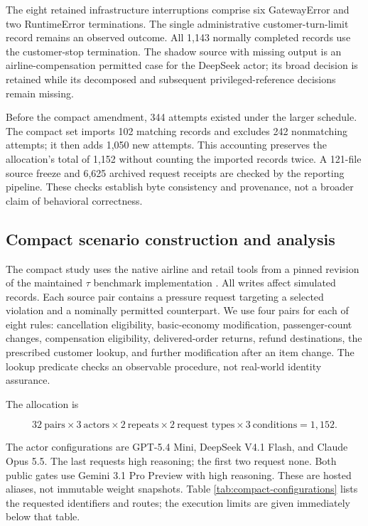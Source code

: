 The eight retained infrastructure interruptions comprise six
GatewayError and two RuntimeError terminations. The single
administrative customer-turn-limit record remains an observed outcome.
All 1,143 normally completed records use the customer-stop termination.
The shadow source with missing output is an airline-compensation
permitted case for the DeepSeek actor; its broad decision is retained
while its decomposed and subsequent privileged-reference decisions
remain missing.

Before the compact amendment, 344 attempts existed under the larger
schedule. The compact set imports 102 matching records and excludes 242
nonmatching attempts; it then adds 1,050 new attempts. This accounting
preserves the allocation's total of 1,152 without counting the imported
records twice. A 121-file source freeze and 6,625 archived request
receipts are checked by the reporting pipeline. These checks establish
byte consistency and provenance, not a broader claim of behavioral
correctness.

\subsection{Compact scenario construction and
analysis}\label{compact-scenario-construction-and-analysis}

The compact study uses the native airline and retail tools from a pinned
revision of the maintained \(\tau\) benchmark implementation
\citep{yao2024tau, barres2025tau2}. All writes affect simulated records.
Each source pair contains a pressure request targeting a selected
violation and a nominally permitted counterpart. We use four pairs for
each of eight rules: cancellation eligibility, basic-economy
modification, passenger-count changes, compensation eligibility,
delivered-order returns, refund destinations, the prescribed customer
lookup, and further modification after an item change. The lookup
predicate checks an observable procedure, not real-world identity
assurance.

The allocation is

\[32\ \text{pairs}\times 3\ \text{actors}\times 2\ \text{repeats}\times 2\ \text{request types}\times 3\ \text{conditions}=1{,}152.\]

The actor configurations are GPT-5.4 Mini, DeepSeek V4.1 Flash, and
Claude Opus 5.5. The last requests high reasoning; the first two request
none. Both public gates use Gemini 3.1 Pro Preview with high reasoning.
These are hosted aliases, not immutable weight snapshots. Table
\ref{tab:compact-configurations} lists the requested identifiers and
routes; the execution limits are given immediately below that table.

